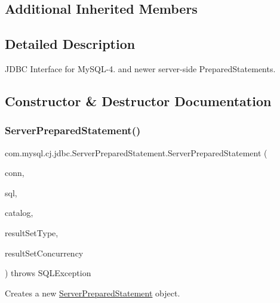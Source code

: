 \subsection*{Additional Inherited Members}


\subsection{Detailed Description}
J\+D\+BC Interface for My\+S\+Q\+L-\/4. and newer server-\/side Prepared\+Statements. 

\subsection{Constructor \& Destructor Documentation}
\mbox{\label{classcom_1_1mysql_1_1cj_1_1jdbc_1_1_server_prepared_statement_a7ba66017e5f394e2b28838c1bb2509d6}} 
\subsubsection{\texorpdfstring{Server\+Prepared\+Statement()}{ServerPreparedStatement()}}
{\footnotesize\ttfamily com.\+mysql.\+cj.\+jdbc.\+Server\+Prepared\+Statement.\+Server\+Prepared\+Statement (\begin{DoxyParamCaption}\item[{\mbox{\hyperlink{interfacecom_1_1mysql_1_1cj_1_1jdbc_1_1_jdbc_connection}{Jdbc\+Connection}}}]{conn,  }\item[{String}]{sql,  }\item[{String}]{catalog,  }\item[{int}]{result\+Set\+Type,  }\item[{int}]{result\+Set\+Concurrency }\end{DoxyParamCaption}) throws S\+Q\+L\+Exception\hspace{0.3cm}{\ttfamily [protected]}}

Creates a new \mbox{\hyperlink{classcom_1_1mysql_1_1cj_1_1jdbc_1_1_server_prepared_statement}{Server\+Prepared\+Statement}} object.


